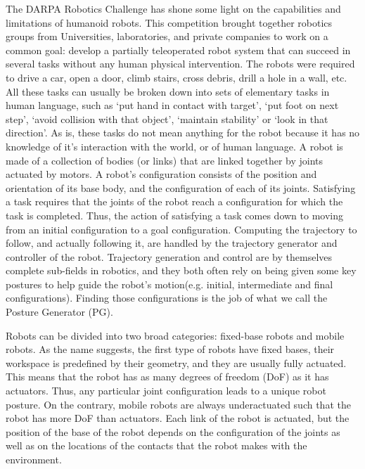 The DARPA Robotics Challenge has shone some light on the capabilities and limitations of humanoid robots.
This competition brought together robotics groups from Universities, laboratories, and private companies to work on a common goal: develop a partially teleoperated robot system that can succeed in several tasks without any human physical intervention.
The robots were required to drive a car, open a door, climb stairs, cross debris, drill a hole in a wall, etc.
All these tasks can usually be broken down into sets of elementary tasks in human language, such as `put hand in contact with target', `put foot on next step', `avoid collision with that object', `maintain stability' or `look in that direction'.
As is, these tasks do not mean anything for the robot because it has no knowledge of it's interaction with the world, or of human language.
A robot is made of a collection of bodies (or links) that are linked together by joints actuated by motors.
A robot's configuration consists of the position and orientation of its base body, and the configuration of each of its joints.
Satisfying a task requires that the joints of the robot reach a configuration for which the task is completed.
Thus, the action of satisfying a task comes down to moving from an initial configuration to a goal configuration.
Computing the trajectory to follow, and actually following it, are handled by the trajectory generator and controller of the robot.
Trajectory generation and control are by themselves complete sub-fields in robotics, and they both often rely on being given some key postures to help guide the robot's motion(e.g. initial, intermediate and final configurations).
Finding those configurations is the job of what we call the Posture Generator (PG).

Robots can be divided into two broad categories: fixed-base robots and mobile robots.
As the name suggests, the first type of robots have fixed bases, their workspace is predefined by their geometry, and they are usually fully actuated.
This means that the robot has as many degrees of freedom (DoF) as it has actuators. Thus, any particular joint configuration leads to a unique robot posture.
On the contrary, mobile robots are always underactuated such that the robot has more DoF than actuators.
Each link of the robot is actuated, but the position of the base of the robot depends on the configuration of the joints as well as on the locations of the contacts that the robot makes with the environment.


